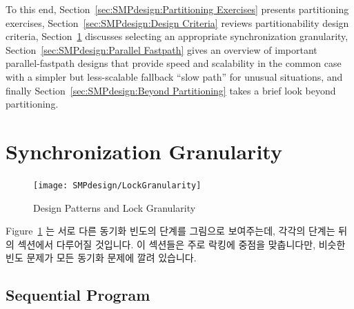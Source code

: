 To this end, Section~\ref{sec:SMPdesign:Partitioning Exercises}
presents partitioning exercises,
Section~\ref{sec:SMPdesign:Design Criteria} reviews partitionability
design criteria,
Section~\ref{sec:SMPdesign:Synchronization Granularity}
discusses selecting an appropriate synchronization granularity,
Section~\ref{sec:SMPdesign:Parallel Fastpath}
gives an overview of important parallel-fastpath designs
that provide speed and scalability in the common case with
a simpler but less-scalable fallback ``slow path'' for unusual
situations,
and finally
Section~\ref{sec:SMPdesign:Beyond Partitioning}
takes a brief look beyond partitioning.
\fi





\section{Synchronization Granularity}
\label{sec:SMPdesign:Synchronization Granularity}

\begin{figure}[tb]
\centering
\texttt{[image: SMPdesign/LockGranularity]}
\caption{Design Patterns and Lock Granularity}
\label{fig:SMPdesign:Design Patterns and Lock Granularity}
\end{figure}

Figure~\ref{fig:SMPdesign:Design Patterns and Lock Granularity} 는 서로 다른
동기화 빈도의 단계를 그림으로 보여주는데, 각각의 단계는 뒤의 섹션에서 다루어질
것입니다.
이 섹션들은 주로 락킹에 중점을 맞춥니다만, 비슷한 빈도 문제가 모든 동기화
문제에 깔려 있습니다.

\subsection{Sequential Program}
\label{sec:SMPdesign:Sequential Program}

